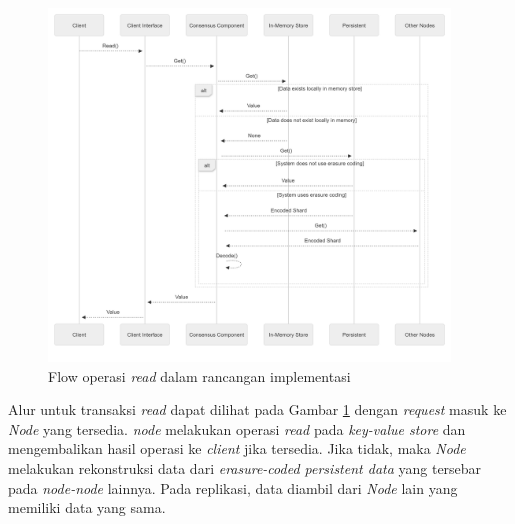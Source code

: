 \begin{figure}[!ht]
    \centering
    \includegraphics[width=0.95\textwidth]{resources/chapter-3/flow-read.png}
    \caption{Flow operasi \textit{read} dalam rancangan implementasi}
    \label{fig:flow-read-mermaidjs}
\end{figure}

Alur untuk transaksi \textit{read} dapat dilihat pada Gambar \ref{fig:flow-read-mermaidjs} dengan \textit{request} masuk ke \textit{Node} yang tersedia. \textit{node} melakukan operasi \textit{read} pada \textit{key-value store} dan mengembalikan hasil operasi ke \textit{client} jika tersedia. Jika tidak, maka \textit{Node} melakukan rekonstruksi data dari \textit{erasure-coded persistent data} yang tersebar pada \textit{node-node} lainnya. Pada replikasi, data diambil dari \textit{Node} lain yang memiliki data yang sama.